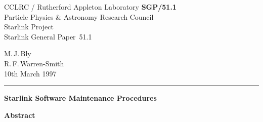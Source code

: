 \documentclass[twoside,11pt]{article}
\newcommand{\stardoccategory}  {Starlink General Paper}
\newcommand{\stardocinitials}  {SGP}
\newcommand{\stardocnumber}    {51.1}
\newcommand{\stardocauthors}   {M.\,J.\,Bly\\R.\,F.\,Warren-Smith}
\newcommand{\stardocdate}      {10th March 1997}
\newcommand{\stardoctitle}     {Starlink Software Maintenance Procedures}
\newcommand{\stardocname}{\stardocinitials /\stardocnumber}
\newenvironment{latexonly}{}{}
\begin{document}
\thispagestyle{empty}

\begin{latexonly}
   CCLRC / {\sc Rutherford Appleton Laboratory} \hfill {\bf \stardocname}\\
   {\large Particle Physics \& Astronomy Research Council}\\
   {\large Starlink Project\\}
   {\large \stardoccategory\ \stardocnumber}
   \begin{flushright}
   \stardocauthors\\
   \stardocdate
   \end{flushright}
   \vspace{-4mm}
   \rule{\textwidth}{0.5mm}
   \vspace{5mm}
   \begin{center}
   {\huge\bf \stardoctitle}
   \end{center}
   \vspace{5mm}

   \vspace{10mm}
   \begin{center}
      {\Large\bf Abstract}
   \end{center}
\end{latexonly}
\end{document}
